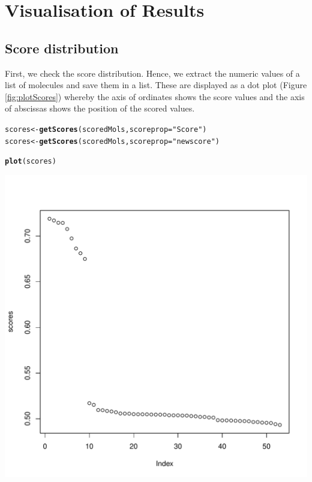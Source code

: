 \documentclass[12pt, a4paper]{scrartcl}\usepackage[]{graphicx}\usepackage[]{color}
\makeatletter
\def\maxwidth{ %
  \ifdim\Gin@nat@width>\linewidth
    \linewidth
  \else
    \Gin@nat@width
  \fi
}
\newcommand{\hlstr}[1]{\textcolor[rgb]{0.192,0.494,0.8}{#1}}%
\newcommand{\hlstd}[1]{\textcolor[rgb]{0.345,0.345,0.345}{#1}}%
\newcommand{\hlkwb}[1]{\textcolor[rgb]{0.69,0.353,0.396}{#1}}%
\newcommand{\hlkwc}[1]{\textcolor[rgb]{0.333,0.667,0.333}{#1}}%
\newcommand{\hlkwd}[1]{\textcolor[rgb]{0.737,0.353,0.396}{\textbf{#1}}}%
\newenvironment{kframe}{%
 \def\at@end@of@kframe{}%
 \ifinner\ifhmode%
  \def\at@end@of@kframe{\end{minipage}}%
  \begin{minipage}{\columnwidth}%
 \fi\fi%
 \def\FrameCommand##1{\hskip\@totalleftmargin \hskip-\fboxsep
 \colorbox{shadecolor}{##1}\hskip-\fboxsep
     \hskip-\linewidth \hskip-\@totalleftmargin \hskip\columnwidth}%
 \MakeFramed {\advance\hsize-\width
   \@totalleftmargin\z@ \linewidth\hsize
   \@setminipage}}%
 {\par\unskip\endMakeFramed%
 \at@end@of@kframe}
\newenvironment{knitrout}{}{} %
\makeatother
\begin{document}
\newpage
\section{Visualisation of Results}
\subsection{Score distribution}
First, we check the score distribution. Hence, we extract the numeric values of a list of molecules
and save them in a list. These are displayed as a dot plot (Figure \ref{fig:plotScores}) whereby the axis of ordinates shows the score values and the axis of abscissas shows the position of the scored values.
\begin{knitrout}
\color{fgcolor}\begin{kframe}
\begin{alltt}
\hlstd{scores} \hlkwb{<-} \hlkwd{getScores}\hlstd{(scoredMols,} \hlkwc{scoreprop}\hlstd{=}\hlstr{"Score"}\hlstd{)}
\hlstd{scores} \hlkwb{<-} \hlkwd{getScores}\hlstd{(scoredMols,} \hlkwc{scoreprop}\hlstd{=}\hlstr{"newscore"}\hlstd{)}

\hlkwd{plot}\hlstd{(scores)}
\end{alltt}
\end{kframe}
\includegraphics[width=\maxwidth]{figure/plotScores} 

\end{knitrout}
\end{document}
